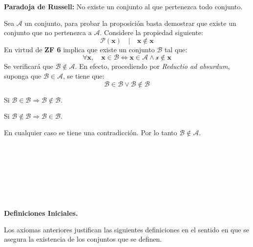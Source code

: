 \begin{proposition}
\textbf{Paradoja de Russell:} No existe un conjunto al que pertenezca todo conjunto.
\end{proposition}
\begin{proof2}
Sea $\mathcal{A}$ un conjunto, para probar la proposición basta demostrar que existe un conjunto que no pertenezca a $\mathcal{A}$.
Considere la propiedad siguiente: 
\[
\mathcal{P}(\mathbf{x}) \quad | \quad \mathbf{x} \notin \mathbf{x}
\]
En virtud de \textbf{ZF 6} implica que existe un conjunto $\mathcal{B}$ tal que:
\[
\forall \mathbf{x}, \quad \mathbf{x} \in \mathcal{B} \Longleftrightarrow \mathbf{x} \in \mathcal{A} \wedge \mathcal{x} \notin \mathbf{x}
\]
Se verificará que $\mathcal{B} \notin \mathcal{A}$. En efecto, procediendo por \textit{Reductio ad absurdum}, suponga que $\mathcal{B} \in \mathcal{A}$, se tiene que:
\[ 
\mathcal{B} \in \mathcal{B} \vee \mathcal{B} \notin \mathcal{B}
\]
\begin{iteritem}
\item Si $\mathcal{B} \in \mathcal{B} \Longrightarrow \mathcal{B} \notin \mathcal{B}$.
\item Si $\mathcal{B} \notin \mathcal{B} \Longrightarrow \mathcal{B} \in \mathcal{B}$.
\end{iteritem}

En cualquier caso se tiene una contradicción. Por lo tanto $\mathcal{B} \notin \mathcal{A}$.\\
\end{proof2}
\\
\\
\medskip
\\
\\
\medskip
\\
\\
\medskip

\begin{centering}
	\textbf{Definiciones Iniciales.} \\
\end{centering}
Los axiomas anteriores justifican las siguientes definiciones en el sentido en que se asegura
la existencia de los conjuntos que se definen.

